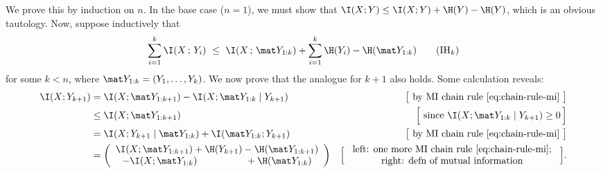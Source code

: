 \begin{subappendices}
\begin{lproof}
    We prove this by induction on $n$. In the base case ($n=1$), 
    we must show that $\I(X;Y)  \le \I(X;Y) + \H(Y) - \H(Y)$, which is an obvious tautology. 
    Now, suppose inductively that 
    \[
        \sum_{i=1}^k \I(X\,;\,Y_i) 
        ~\le~
         \I(X \,;\, \mat Y_{1:k}) + \sum_{i=1}^k \H(Y_i) - \H(\mat Y_{1:k})
         \tag{IH$_k$}
    \]
    for some $k < n$, where $\mat Y_{1:k} = (Y_1, \ldots, Y_k)$. 
    We now prove that the analogue for $k+1$ also holds. 
    Some calculation reveals:
    \begin{align*}
        \I(X ; Y_{k+1}) &= \I(X ; \mat Y_{1:k+1}) - \I(X ; \mat Y_{1:k} \mid Y_{k+1}) 
            & \big[\text{ by MI chain rule \eqref{eq:chain-rule-mi} } \big]
        \\
            &\le \I(X ; \mat Y_{1:k+1})
            & \Big[\text{ since } \I(X ; \mat Y_{1:k} \mid Y_{k+1}) \ge 0\, \Big] \\
        &= \I(X;  Y_{k+1} \mid \mat Y_{1:k}) + \I(\mat Y_{1:k} ;  Y_{k+1})
            & \big[\text{ by MI chain rule \eqref{eq:chain-rule-mi} } \big] \\
        &= \left(
        \begin{array}{c}
        \I(X ; \mat Y_{1:k+1}) + \H(Y_{k+1}) - \H( \mat Y_{1:k+1}) \\
         - \I(X ; \mat Y_{1:k})  \qquad\quad\qquad + \H( \mat Y_{1:k} )           
     \end{array}\right)
        & \Big[
        \begin{array}{c}
        \text{ left: one more MI chain rule \eqref{eq:chain-rule-mi}; } \\
        \text{ right: defn of mutual information  }    
        \end{array}
        \Big].
    \end{align*}
    

\end{lproof}
\end{subappendices}

